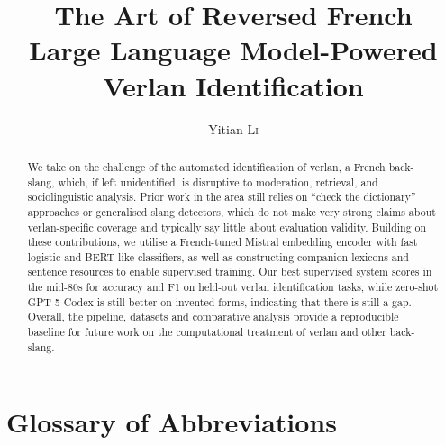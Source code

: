 \documentclass[12pt]{article}
\title{The Art of Reversed French\\\large Large Language Model-Powered Verlan Identification}
\author{Yitian \textsc{Li}}
\begin{document}
\maketitle

\begin{abstract}
We take on the challenge of the automated identification of verlan, a French back-slang, which, if left unidentified, is disruptive to moderation, retrieval, and sociolinguistic analysis. Prior work in the area still relies on ``check the dictionary'' approaches or generalised slang detectors, which do not make very strong claims about verlan-specific coverage and typically say little about evaluation validity. Building on these contributions, we utilise a French-tuned Mistral embedding encoder with fast logistic and BERT-like classifiers, as well as constructing companion lexicons and sentence resources to enable supervised training. Our best supervised system scores in the mid-80s for accuracy and F1 on held-out verlan identification tasks, while zero-shot GPT-5 Codex is still better on invented forms, indicating that there is still a gap. Overall, the pipeline, datasets and comparative analysis provide a reproducible baseline for future work on the computational treatment of verlan and other back-slang.
\end{abstract}

\clearpage
\tableofcontents

\clearpage
\section*{Glossary of Abbreviations}
\end{document}
